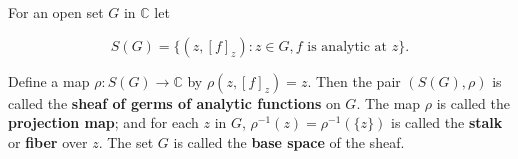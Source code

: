 For an open set $G$ in $\mathbb{C}$ let

$$S(G) = \{(z, [f]_z) : z \in G, f \text{ is analytic at } z\}.$$

Define a map $\rho: S(G) \to \mathbb{C}$ by $\rho(z, [f]_z) = z$. Then the pair $(S(G), \rho)$ is called the \textbf{sheaf of germs of analytic functions} on $G$. The map $\rho$ is called the \textbf{projection map}; and for each $z$ in $G$, $\rho^{-1}(z) = \rho^{-1}(\{z\})$ is called the \textbf{stalk} or \textbf{fiber} over $z$. The set $G$ is called the \textbf{base space} of the sheaf.
